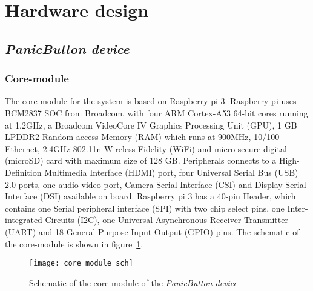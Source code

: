 
\section{Hardware design}
\label{sec:hardware}
\subsection{\emph{PanicButton device}}
\subsubsection{Core-module}
The core-module for the system is based on Raspberry pi 3. Raspberry pi uses BCM2837 SOC from Broadcom, with four ARM Cortex-A53 64-bit cores running at 1.2GHz, a Broadcom VideoCore IV Graphics Processing Unit (GPU), 1 GB LPDDR2 Random access Memory (RAM) which runs at 900MHz, 10/100 Ethernet, 2.4GHz 802.11n Wireless Fidelity (WiFi) and micro secure digital (microSD) card with maximum size of 128 GB. Peripherals connects to a High-Definition Multimedia Interface (HDMI) port, four Universal Serial Bus (USB) 2.0 ports, one audio-video port, Camera Serial Interface (CSI) and Display Serial Interface (DSI) available on board.
Raspberry pi 3 has a 40-pin Header, which contains one Serial peripheral interface (SPI) with two chip select pins, one Inter-integrated Circuits (I2C), one Universal Asynchronous Receiver Transmitter (UART) and 18 General Purpose Input Output (GPIO) pins.
The schematic of the core-module is shown in figure~\ref{fig:core_module_sch}.
\begin{figure}[H]
\centering
\texttt{[image: core\_module\_sch]}
\caption{Schematic of the core-module of the \emph{PanicButton device}}
\label{fig:core_module_sch}
\end{figure}



